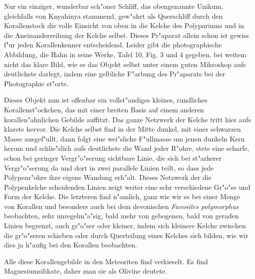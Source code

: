 \documentclass[a4paper, 12pt, oneside]{article}
\begin{document}
Nur ein einziger, wunderbar sch"oner Schliff, das obengenannte Unikum, gleichfalls von Knyahinya stammend, gew"ahrt als Querschliff durch den Korallenstock die volle Einsicht von oben in die Kelche des Polypariums und in die Aneinanderreihung der Kelche selbst. Dieses Pr"aparat allein schon ist gewiss f"ur jeden Korallenkenner entscheidend. Leider gibt die photographische Abbildung, die Hahn in seine Werke, Tafel 10, Fig. 3 und 4 gegeben, bei weitem nicht das klare Bild, wie es das Objekt selbst unter einem guten Mikroskop aufs deutlichste darlegt, indem eine gelbliche F"arbung des Pr"aparats bei der Photographie st"orte.

Dieses Objekt nun ist offenbar ein vollst"andiges kleines, rundliches Korallenst"ockchen, das mit einer breiten Basis auf einem anderen korallen"ahnlichen Gebilde auffitzt. Das ganze Netzwerk der Kelche tritt hier aufs klarste hervor. Die Kelche selbst find in der Mitte dunkel, mit einer schwarzen Masse ausgef"ullt, dann folgt eine wei"sliche F"ullmasse um jenen dunkeln Kern herum und schlie"slich aufs deutlichste die Wand jeder R"ohre, stets eine scharfe, schon bei geringer Vergr"o"serung sichtbare Linie, die sich bei st"arkerer Vergr"o"serung da und dort in zwei parallele Linien teilt, so dass jede Polypenr"ohre ihre eigene Wandung erh"alt. Dieses Netzwerk der die Polypenkelche scheidenden Linien zeigt weiter eine sehr verschiedene Gr"o"se und Form der Kelche. Die letzteren find n"amlich, ganz wie wir es bei einer Menge von Korallen und besonders auch bei dem devonischen \emph{Favosites polymorphus} beobachten, sehr unregelm"a"sig, bald mehr von gebogenen, bald von geraden Linien begrenzt, auch gr"o"ser oder kleiner, indem sich kleinere Kelche zwischen die gr"o"seren schieben oder durch Querteilung eines Kelches sich bilden, wie wir dies ja h"aufig bei den Korallen beobachten.

Alle diese Korallengebilde in den Meteoriten find verkieselt. Es find Magnesiumsilikate, daher man sie als Olivine deutete.
\end{document}
